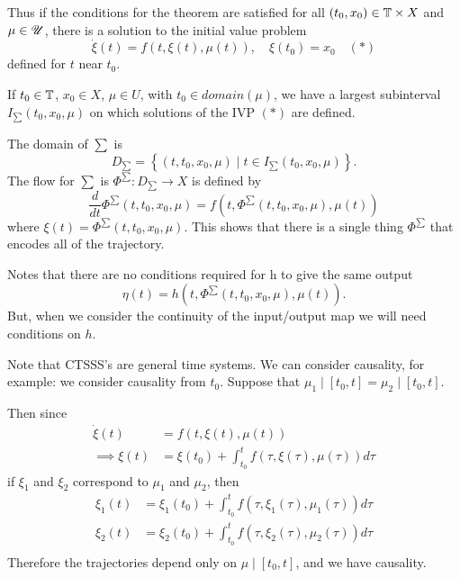 Thus if the conditions for the theorem are satisfied for all $\left( t_0, x_0  \right) \in  \mathbb{T} \times  X$ and $\mu \in  \mathscr{U}$, there is a solution to the initial value problem
\[
	\dot{\xi}\left( t \right) = f\left( t , \xi\left( t \right) , \mu\left( t \right)  \right) , \quad \xi\left( t_0 \right) = x_0 \quad \left( * \right) 
\] 
defined for $t$ near $t_0$. 

If $t_0 \in  \mathbb{T}$, $x_0 \in  X$, $\mu \in  U$, with  $t_0 \in  domain\left( \mu \right) $, we have a largest subinterval $I_{\sum }\left( t_0, x_0, \mu \right) $ on which solutions of the IVP $\left( * \right) $ are defined. 

The domain of $\sum $ is 
\[
	D_{\sum } = \left\{ \left( t, t_0, x_0, \mu \right)  \mid t \in  I _{\sum }\left( t_0, x_0, \mu \right)  \right\} 
.\] 
The flow for $\sum $ is $\Phi ^{\sum} : D_{\sum } \to X$ is defined by 
\[
	\frac{d}{dt}\Phi^{\sum }\left( t, t_0, x_0, \mu \right) = f\left( t, \Phi^{\sum }\left( t, t_0, x_0, \mu \right) , \mu\left( t \right) \right) 
\] 
where $\xi\left( t \right) = \Phi^{\sum }\left( t, t_0, x_0, \mu \right) $. This shows that there is a single thing $\Phi^{\sum }$ that encodes all of the trajectory. 

Notes that there are no conditions required for h to give the same output
\[
	\eta\left( t \right)  = h \left( t , \Phi^{\sum }\left( t, t_0, x_0, \mu \right) , \mu\left( t \right)  \right) 
.\] 
But, when we consider the continuity of the input/output map we will need conditions on $h$.

Note that CTSSS's are general time systems. We can consider causality, for example: we consider causality from $t_0$. Suppose that $\mu_1  \mid  \left[ t_0, t \right] = \mu_2  \mid  \left[ t_0, t \right] $. 

Then since
\begin{align*}
	\dot{\xi} \left( t \right) &= f\left( t, \xi\left( t \right) , \mu\left( t \right)  \right)  \\
	\implies\xi\left( t \right) &=  \xi\left( t_0 \right) + \int_{t_0}^{t} f\left( \tau, \xi\left( \tau \right) , \mu\left( \tau \right)  \right) d\tau
\end{align*}
if $\xi_1$ and $\xi_2$ correspond to  $\mu_1$ and $\mu_2$, then 
\begin{align*}
	\xi_{1}\left( t \right) &=  \xi_1 \left( t_0 \right) + \int_{t_0}^{t} f\left( \tau, \xi_1\left( \tau \right) , \mu_1 \left( \tau \right)  \right) d\tau \\
	\xi_{2}\left( t \right) &=  \xi_2 \left( t_0 \right) + \int_{t_0}^{t} f\left( \tau, \xi_2\left( \tau \right) , \mu_2 \left( \tau \right)  \right) d\tau \\
\end{align*}
Therefore the trajectories depend only on $\mu  \mid \left[ t_0, t \right] $, and we have causality.
